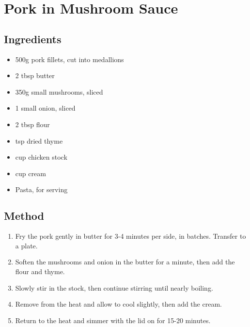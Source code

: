 \section{Pork in Mushroom Sauce}


\subsection{Ingredients}

\begin{itemize}
	\item 500g pork fillets, cut into medallions
	\item 2 tbsp butter
	\item 350g small mushrooms, sliced
	\item 1 small onion, sliced
	\item 2 tbsp flour
	\item {} tsp dried thyme
	\item {} cup chicken stock
	\item {} cup cream
	\item Pasta, for serving
\end{itemize}

\subsection{Method}

\begin{enumerate}
    \item Fry the pork gently in butter for 3-4 minutes per side, in batches. Transfer to a plate.
	\item Soften the mushrooms and onion in the butter for a minute, then add the flour and thyme.
	\item Slowly stir in the stock, then continue stirring until nearly boiling.
	\item Remove from the heat and allow to cool slightly, then add the cream.
	\item Return to the heat and simmer with the lid on for 15-20 minutes.
\end{enumerate}
